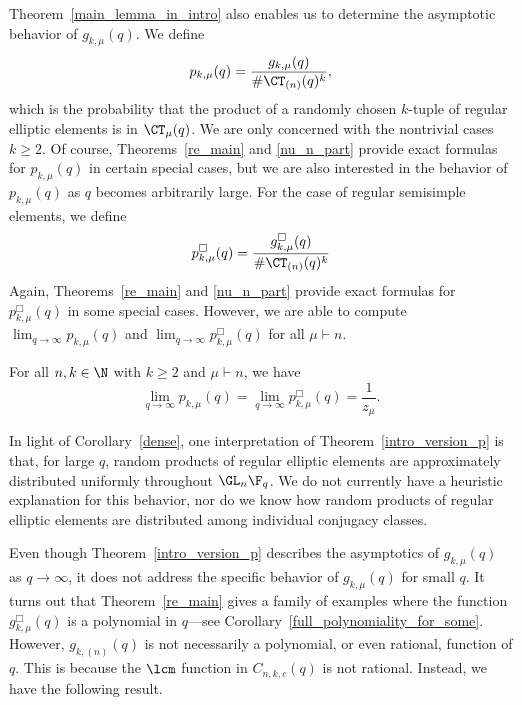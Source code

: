 Theorem~\ref{main_lemma_in_intro} also enables us to determine the asymptotic behavior of \(g_{k,\mu} (q)\).
We define
\begin{equation}
p_{k,\mu} (q) = \frac{g_{k,\mu}(q)}{\# \CT_{(n)} (q)^k},
\end{equation}
which is the probability that the product of a randomly chosen \(k\)-tuple of regular elliptic elements is in \(\CT_\mu (q)\).
We are only concerned with the nontrivial cases \(k \geq 2\).
Of course, Theorems~\ref{re_main} and \ref{nu_n_part} provide exact formulas for \(p_{k,\mu} (q)\) in certain special cases, but we are also interested in the behavior of \(p_{k,\mu}(q)\) as \(q\) becomes arbitrarily large.
For the case of regular semisimple elements,
we define
\begin{equation}
\label{pBox_defs}
p_{k,\mu}^\Box (q) = \frac{g_{k,\mu}^\Box(q)}{\# \CT_{(n)} (q)^k}
\end{equation}
Again, Theorems~\ref{re_main} and \ref{nu_n_part} provide exact formulas for \(p^\Box_{k,\mu} (q)\) in some special cases.
However, we are able to compute \(\lim_{q \to \infty} p_{k,\mu} (q)\) and \(\lim_{q \to \infty} p_{k,\mu}^\Box (q)\) for all \(\mu \vdash n\).

\begin{theorem}
\label{intro_version_p}
For all \(n,k \in \N\) with \(k \geq 2\) and \(\mu \vdash n\), we have
\begin{equation}
\lim_{q \to \infty} p_{k,\mu}      (q) =
\lim_{q \to \infty} p_{k,\mu}^\Box (q) =
\frac{1}{z_\mu}.
\end{equation}
\end{theorem}


In light of Corollary~\ref{dense}, one interpretation of Theorem~\ref{intro_version_p} is that, for large \(q\), random products of regular elliptic elements are approximately distributed uniformly throughout \(\GL_n \F_q\).
We do not currently have a heuristic explanation for this behavior, nor do we know how random products of regular elliptic elements are distributed among individual conjugacy classes.
















Even though Theorem~\ref{intro_version_p} describes the asymptotics of \(g_{k,\mu}(q)\) as \(q \to \infty\), it does not address the specific behavior of \(g_{k,\mu}(q)\) for small \(q\).
It turns out that Theorem~\ref{re_main} gives a family of examples where the function \(g_{k,\mu}^\Box (q)\) is a polynomial in \(q\)---see Corollary~\ref{full_polynomiality_for_some}.
However, \(g_{k,(n)} (q)\) is not necessarily a polynomial, or even rational, function of \(q\).
This is because the \(\lcm\) function in \(C_{n,k,c} (q)\) is not rational.
Instead, we have the following result.

